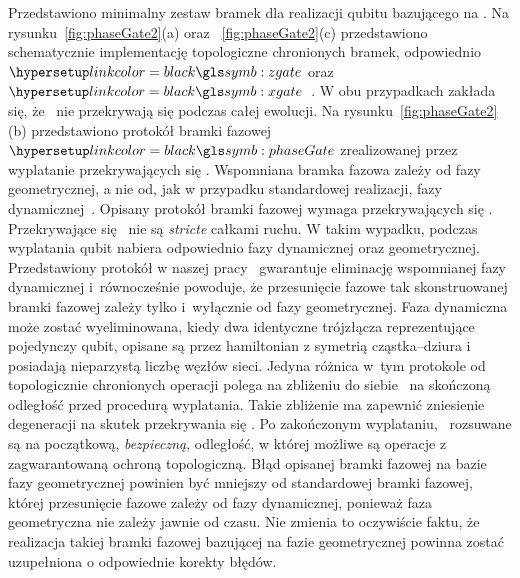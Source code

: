 Przedstawiono minimalny zestaw bramek dla  realizacji qubitu bazującego na \MZM.
Na rysunku~\ref{fig:phaseGate2}(a) oraz ~\ref{fig:phaseGate2}(c) 
przedstawiono schematycznie implementację topologiczne chronionych bramek, odpowiednio $\zgate$ oraz $\xgate$~\cite{alicea.oreg.2011,bravyi.2006}.
W obu przypadkach zakłada się, że \MZM\ nie przekrywają się podczas całej ewolucji.
Na rysunku~\ref{fig:phaseGate2}(b) przedstawiono protokół bramki fazowej $\phaseGate$ zrealizowanej przez wyplatanie przekrywających się \MZM.
Wspomniana bramka fazowa zależy od fazy geometrycznej, a nie od, jak w przypadku standardowej realizacji, fazy dynamicznej~\cite{sarma.freedman.2015}.
Opisany protokół bramki fazowej wymaga przekrywających się \MZM.
Przekrywające się \MZM\ nie są \textit{stricte} całkami ruchu.
W takim wypadku, podczas wyplatania qubit nabiera odpowiednio fazy dynamicznej oraz geometrycznej.
Przedstawiony protokół w naszej pracy~\cite{wieckowski.mierzejewski.2020} gwarantuje eliminację wspomnianej fazy dynamicznej i~równocześnie powoduje, że przesunięcie fazowe tak skonstruowanej bramki fazowej zależy tylko i~wyłącznie od fazy geometrycznej.
Faza dynamiczna może zostać wyeliminowana, kiedy dwa identyczne trójzłącza reprezentujące pojedynczy qubit, opisane są przez hamiltonian z symetrią cząstka--dziura i posiadają nieparzystą liczbę węzłów sieci.
Jedyna różnica w~tym protokole od topologicznie chronionych operacji polega na zbliżeniu do siebie \MZM\ na skończoną odległość przed procedurą wyplatania.
Takie zbliżenie ma zapewnić zniesienie degeneracji na skutek przekrywania się \MZM.
Po zakończonym wyplataniu, \MZM\ rozsuwane są na początkową, \textit{bezpieczną}, odległość, w której możliwe są operacje z zagwarantowaną ochroną topologiczną.
Błąd opisanej bramki fazowej na bazie fazy geometrycznej powinien być mniejszy od standardowej bramki fazowej, której przesunięcie fazowe zależy od fazy dynamicznej, ponieważ faza geometryczna nie zależy jawnie od czasu.
Nie zmienia to oczywiście faktu, że realizacja takiej bramki fazowej bazującej na fazie geometrycznej powinna zostać uzupełniona o odpowiednie korekty błędów.

\ornament
